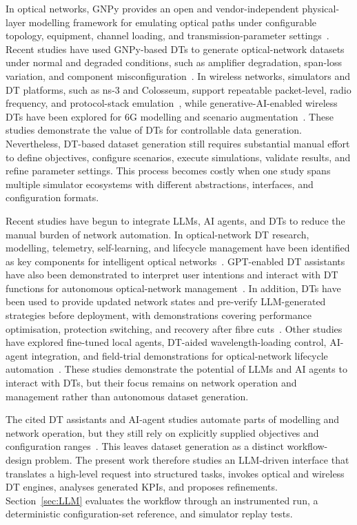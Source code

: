 \documentclass[9pt,twocolumn,twoside]{osajnl}
\begin{document}
In optical networks, GNPy provides an open and vendor-independent physical-layer modelling framework for emulating optical paths under configurable topology, equipment, channel loading, and transmission-parameter settings~\cite{curri2022gnpy}. Recent studies have used GNPy-based DTs to generate optical-network datasets under normal and degraded conditions, such as amplifier degradation, span-loss variation, and component misconfiguration~\cite{mohamed2025dtfailuredb,mohamed2025mlagentsdt}. In wireless networks, simulators and DT platforms, such as ns-3 and Colosseum, support repeatable packet-level, radio frequency, and protocol-stack emulation~\cite{riley2010ns3,polese2024colosseum}, while generative-AI-enabled wireless DTs have been explored for 6G modelling and scenario augmentation~\cite{tao2024wirelessdt,chai2024genaidt}. These studies demonstrate the value of DTs for controllable data generation. Nevertheless, DT-based dataset generation still requires substantial manual effort to define objectives, configure scenarios, execute simulations, validate results, and refine parameter settings. This process becomes costly when one study spans multiple simulator ecosystems with different abstractions, interfaces, and configuration formats.

Recent studies have begun to integrate LLMs, AI agents, and DTs to reduce the manual burden of network automation. In optical-network DT research, modelling, telemetry, self-learning, and lifecycle management have been identified as key components for intelligent optical networks~\cite{wang2024dtreview}. GPT-enabled DT assistants have also been demonstrated to interpret user intentions and interact with DT functions for autonomous optical-network management~\cite{zhang2024gptdtassistant}. In addition, DTs have been used to provide updated network states and pre-verify LLM-generated strategies before deployment, with demonstrations covering performance optimisation, protection switching, and recovery after fibre cuts~\cite{song2025llmdt}. Other studies have explored fine-tuned local agents, DT-aided wavelength-loading control, AI-agent integration, and field-trial demonstrations for optical-network lifecycle automation~\cite{sun2025localaiagents,liu2024autodtwave,zhuge2025dtaiagent,liu2026fieldtrial}. These studies demonstrate the potential of LLMs and AI agents to interact with DTs, but their focus remains on network operation and management rather than autonomous dataset generation.

The cited DT assistants and AI-agent studies automate parts of modelling and network operation, but they still rely on explicitly supplied objectives and configuration ranges~\cite{zhang2024gptdtassistant,song2025llmdt,sun2025localaiagents,liu2024autodtwave}. This leaves dataset generation as a distinct workflow-design problem. The present work therefore studies an LLM-driven interface that translates a high-level request into structured tasks, invokes optical and wireless DT engines, analyses generated KPIs, and proposes refinements. Section~\ref{sec:LLM} evaluates the workflow through an instrumented run, a deterministic configuration-set reference, and simulator replay tests.
\end{document}
